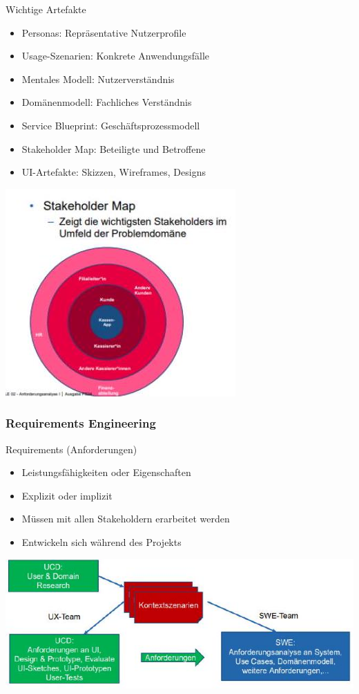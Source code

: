 \begin{theorem}{Wichtige Artefakte}
\begin{itemize}
    \item Personas: Repräsentative Nutzerprofile
    \item Usage-Szenarien: Konkrete Anwendungsfälle
    \item Mentales Modell: Nutzerverständnis
    \item Domänenmodell: Fachliches Verständnis
    \item Service Blueprint: Geschäftsprozessmodell
    \item Stakeholder Map: Beteiligte und Betroffene
    \item UI-Artefakte: Skizzen, Wireframes, Designs
\end{itemize}
\includegraphics[width=0.5\linewidth]{images/2024_12_29_0d1d7b5551ea1b4b41bdg-04}
\end{theorem}

\subsubsection{Requirements Engineering}

\begin{definition}{Requirements (Anforderungen)}
\begin{itemize}
    \item Leistungsfähigkeiten oder Eigenschaften
    \item Explizit oder implizit
    \item Müssen mit allen Stakeholdern erarbeitet werden
    \item Entwickeln sich während des Projekts
\end{itemize}
\includegraphics[width=\linewidth]{images/2024_12_29_0d1d7b5551ea1b4b41bdg-04(1)}
\end{definition}

